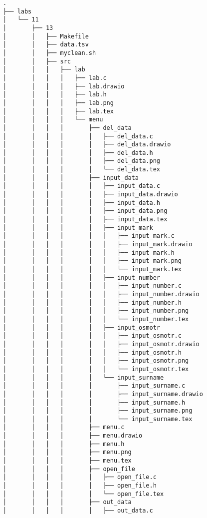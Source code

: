 \begin{verbatim}
.
├── labs
│   └── 11
│       ├── 13
│       │   ├── Makefile
│       │   ├── data.tsv
│       │   ├── myclean.sh
│       │   ├── src
│       │   │   ├── lab
│       │   │   │   ├── lab.c
│       │   │   │   ├── lab.drawio
│       │   │   │   ├── lab.h
│       │   │   │   ├── lab.png
│       │   │   │   ├── lab.tex
│       │   │   │   └── menu
│       │   │   │       ├── del_data
│       │   │   │       │   ├── del_data.c
│       │   │   │       │   ├── del_data.drawio
│       │   │   │       │   ├── del_data.h
│       │   │   │       │   ├── del_data.png
│       │   │   │       │   └── del_data.tex
│       │   │   │       ├── input_data
│       │   │   │       │   ├── input_data.c
│       │   │   │       │   ├── input_data.drawio
│       │   │   │       │   ├── input_data.h
│       │   │   │       │   ├── input_data.png
│       │   │   │       │   ├── input_data.tex
│       │   │   │       │   ├── input_mark
│       │   │   │       │   │   ├── input_mark.c
│       │   │   │       │   │   ├── input_mark.drawio
│       │   │   │       │   │   ├── input_mark.h
│       │   │   │       │   │   ├── input_mark.png
│       │   │   │       │   │   └── input_mark.tex
│       │   │   │       │   ├── input_number
│       │   │   │       │   │   ├── input_number.c
│       │   │   │       │   │   ├── input_number.drawio
│       │   │   │       │   │   ├── input_number.h
│       │   │   │       │   │   ├── input_number.png
│       │   │   │       │   │   └── input_number.tex
│       │   │   │       │   ├── input_osmotr
│       │   │   │       │   │   ├── input_osmotr.c
│       │   │   │       │   │   ├── input_osmotr.drawio
│       │   │   │       │   │   ├── input_osmotr.h
│       │   │   │       │   │   ├── input_osmotr.png
│       │   │   │       │   │   └── input_osmotr.tex
│       │   │   │       │   └── input_surname
│       │   │   │       │       ├── input_surname.c
│       │   │   │       │       ├── input_surname.drawio
│       │   │   │       │       ├── input_surname.h
│       │   │   │       │       ├── input_surname.png
│       │   │   │       │       └── input_surname.tex
│       │   │   │       ├── menu.c
│       │   │   │       ├── menu.drawio
│       │   │   │       ├── menu.h
│       │   │   │       ├── menu.png
│       │   │   │       ├── menu.tex
│       │   │   │       ├── open_file
│       │   │   │       │   ├── open_file.c
│       │   │   │       │   ├── open_file.h
│       │   │   │       │   └── open_file.tex
│       │   │   │       ├── out_data
│       │   │   │       │   ├── out_data.c

\end{verbatim}
